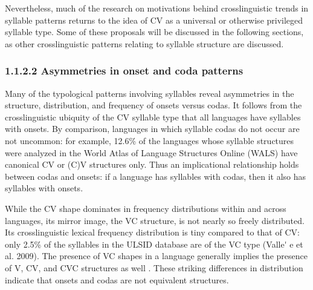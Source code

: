   Nevertheless, much of the research on motivations behind crosslinguistic trends in syllable patterns returns to the idea of CV as a universal or otherwise privileged syllable type. Some of these proposals will be discussed in the following sections, as other crosslinguistic patterns relating to syllable structure are discussed.

\subsubsection{\textbf{1.1.2.2} \textbf{Asymmetries} \textbf{in} \textbf{onset} \textbf{and} \textbf{coda} \textbf{patterns}}

  Many of the typological patterns involving syllables reveal asymmetries in the structure, distribution, and frequency of onsets versus codas. It follows from the crosslinguistic ubiquity of the CV syllable type that all languages have syllables with onsets. By comparison, languages in which syllable codas do not occur are not uncommon: for example, 12.6\% of the languages whose syllable structures were analyzed in the World Atlas of Language Structures Online (WALS) have canonical CV or (C)V structures only. Thus an implicational relationship holds between codas and onsets: if a language has syllables with codas, then it also has syllables with onsets.

  While the CV shape dominates in frequency distributions within and across languages, its mirror image, the VC structure, is not nearly so freely distributed. Its crosslinguistic lexical frequency distribution is tiny compared to that of CV: only 2.5\% of the syllables in the ULSID database are of the VC type (Valle\'{} e et al. 2009). The presence of VC shapes in a language generally implies the presence of V, CV, and CVC structures as well \citep{Blevins1995}. These striking differences in distribution indicate that onsets and codas are not equivalent structures.

